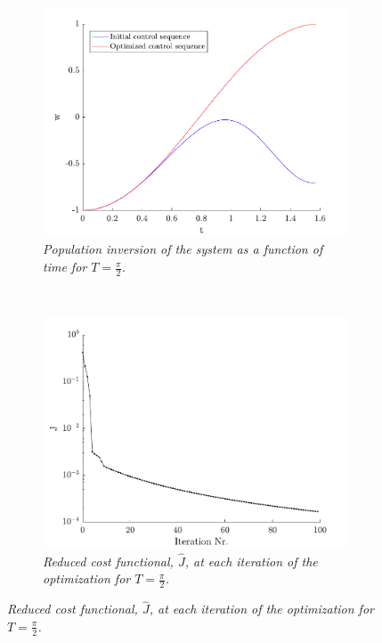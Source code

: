 \begin{figure}[h!]
	~
    \begin{subfigure}[t]{0.49\textwidth}
        \includegraphics[width=\textwidth]{Figures/pop.pdf}
        \caption{\textit{Population inversion of the system as a function of time for $T = \frac{\pi}{2}$.}}
        \label{fig:population}
    \end{subfigure}
    ~
    \begin{subfigure}[t]{0.49\textwidth}
        \includegraphics[width=\textwidth]{Figures/cost.pdf}
        \caption{\textit{Reduced cost functional, $\hat{J}$, at each iteration of the optimization for $T = \frac{\pi}{2}$.}}
        \label{fig:cost}
    \end{subfigure}    
\end{figure}
